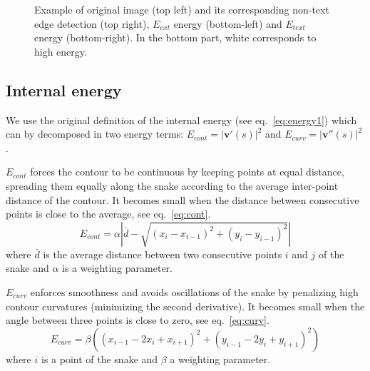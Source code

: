 \documentclass[conference]{IEEEtran}
\begin{document}
	\begin{figure}[!ht]	%
	  \centering
		\caption{Example of original image (top left) and its corresponding non-text edge detection (top right), $E_{ext}$ energy (bottom-left) and $E_{text}$ energy (bottom-right). In the bottom part, white corresponds to high energy.}
		\label{fig:distance_transform}
	\end{figure}

\subsection{Internal energy}
We use the original definition of the internal energy (see eq.~\ref{eq:energy1}) which can by decomposed in two energy terms: $E_{cont} = \left|\mathbf{v}'(s) \right|^2$ and $E_{curv}=\left| \mathbf{v}''(s) \right|^2$. %
% 

$E_{cont}$ forces the contour to be continuous by keeping points at equal distance, spreading them equally along the snake according to the average inter-point distance of the contour. It becomes small when the distance between consecutive points is close to the average, see eq.~\ref{eq:cont}.
\begin{equation}\label{eq:cont}
 E_{cont} = \alpha |\bar{d} - \sqrt{(x_i - x_{i-1} )^2 + (y_i - y_{i-1} )^2}|
\end{equation}
where $\bar{d}$ is the average distance between two consecutive points $i$ and $j$ of the snake and $\alpha$ is a weighting parameter.

$E_{curv}$ enforces smoothness and avoids oscillations of the snake by penalizing high contour curvatures (minimizing the second derivative). It becomes small when the angle between three points is close to zero, see eq.~\ref{eq:curv}.%
\begin{equation}\label{eq:curv}
  E_{curv} = \beta \left( (x_{i-1} - 2x_{i} + x_{i+1})^2 + (y_{i-1} - 2y_{i} + y_{i+1})^2 \right)
\end{equation}
where $i$ is a point of the snake and $\beta$ a weighting parameter.
\end{document}
